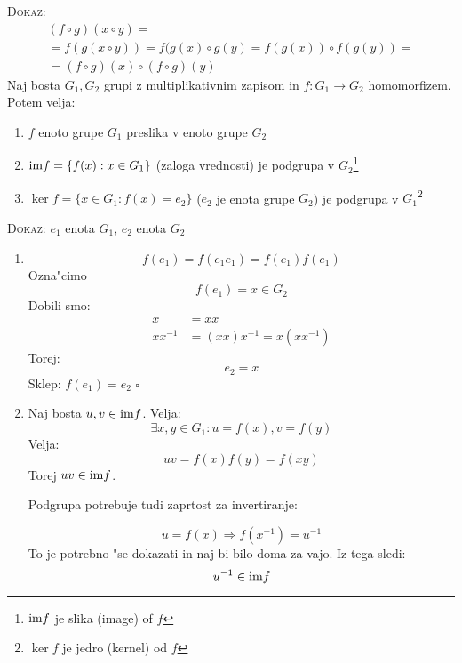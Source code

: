 \textsc{Dokaz:}
\begin{multline*}
	(f \circ g) (x \circ y) = \\
	= f(g(x \circ y)) = f(g(x) \circ g(y) = f(g(x)) \circ f(g(y)) = \\
	= (f\circ g)(x) \circ (f \circ g) (y)
\end{multline*}
Naj bosta $G_1, G_2$ grupi z multiplikativnim zapisom in $f: G_1 \to G_2$ homomorfizem. Potem velja:
\begin{enumerate}[(1)]
	\item $f$ enoto grupe $G_1$ preslika v enoto grupe $G_2$
	\item $\text{im} f = \{f(x): x \in G_1\}$ (zaloga vrednosti) je podgrupa v $G_2$\footnote{$\text{im} f$ je slika (image) of $f$}
	\item $\ker f = \{x \in G_1: f(x) = e_2\}$ ($e_2$ je enota grupe $G_2$) je podgrupa v $G_1$\footnote{$\ker f$ je jedro (kernel) od $f$}
\end{enumerate}
\textsc{Dokaz:} $e_1$ enota $G_1$, $e_2$ enota $G_2$
\begin{enumerate}[(1)]
	\item {}
	\begin{equation*}
	f(e_1) = f(e_1 e_1) = f(e_1)f(e_1)
	\end{equation*}
	Ozna"cimo
	\begin{equation*}
	f(e_1) = x \in G_2
	\end{equation*}
	Dobili smo:
	\begin{align*}
	x &= xx \\
	xx^{-1} &= (xx)x^{-1} = x(xx^{-1})
	\end{align*}
	Torej:
	\begin{equation*}
	e_2 = x
	\end{equation*}
	Sklep: $f(e_1) = e_2$ \hfill $\square$
	
	\item {}
	
	Naj bosta $u, v \in \text{im} f$. Velja:
	\begin{equation*}
	\exists x, y \in G_1: u = f(x), v = f(y)
	\end{equation*}
	Velja:
	\begin{equation*}
	uv = f(x)f(y) = f(xy)
	\end{equation*}
	Torej $uv \in \text{im} f$.
	
	Podgrupa potrebuje tudi zaprtost za invertiranje:
	
	\begin{equation*}
	u = f(x) \Rightarrow f(x^{-1}) = u^{-1}
	\end{equation*}
	To je potrebno "se dokazati in naj bi bilo doma za vajo. Iz tega sledi:
	\begin{equation*}
	u^{-1} \in \text{im} f
	\end{equation*}
\end{enumerate}